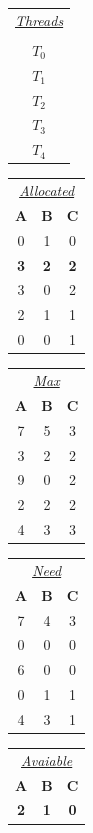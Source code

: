 \begin{table}[h]
    \centering
    \begin{tabular}{c}
         \underline{\textit{Threads}} \\\\ $T_0$ \\ $T_1$ \\ $T_2$ \\ $T_3$ \\ $T_4$
    \end{tabular}
    \begin{tabular}{c c c}
         \multicolumn{3}{c}{\underline{\textit{Allocated}}} \\
         \textbf{A} & \textbf{B} & \textbf{C} \\
         0 & 1 & 0 \\
         \textbf{3} & \textbf{2} & \textbf{2} \\
         3 & 0 & 2 \\
         2 & 1 & 1 \\
         0 & 0 & 1
    \end{tabular}
    \hspace{5px}
    \begin{tabular}{c c c}
         \multicolumn{3}{c}{\underline{\textit{Max}}} \\
         \textbf{A} & \textbf{B} & \textbf{C} \\
         7 & 5 & 3 \\
         3 & 2 & 2 \\
         9 & 0 & 2 \\
         2 & 2 & 2 \\
         4 & 3 & 3 \\
    \end{tabular}    
    \hspace{5pt}    
    \begin{tabular}{c c c}
         \multicolumn{3}{c}{\underline{\textit{Need}}} \\
         \textbf{A} & \textbf{B} & \textbf{C} \\
         7 & 4 & 3 \\
         0 & 0 & 0 \\
         6 & 0 & 0 \\
         0 & 1 & 1 \\
         4 & 3 & 1 \\
    \end{tabular}
    \hspace{5pt}
    \begin{tabular}{c c c}
         \multicolumn{3}{c}{\underline{\textit{Avaiable}}} \\
         \textbf{A} & \textbf{B} & \textbf{C} \\
         \textbf{2} & \textbf{1} & \textbf{0}
    \end{tabular}
\end{table}

